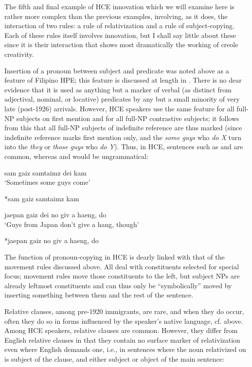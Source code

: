 The fifth and final example of HCE innovation which we will examine here is rather more complex than the previous examples, involving, as it does, the interaction of two rules: a rule of relativization and a rule of subject-copying. Each of these rules itself involves inno\-vation, but I shall say little about these since it is their interaction that shows most dramatically the working of creole creativity.

Insertion of a pronoun between subject and predicate was noted above as a feature of Filipino HPE; this feature is discussed at length in \citet[3.6.1]{BickertonEtAl1976}. There is no dear evidence that it is used as anything but a marker of verbal (as distinct from adjectival, nominal, or locative) predicates by any but a small minority of very late (post-1926) arrivals. However, HCE speakers use the same feature for all full-NP subjects on first mention and for all full-NP contrastive subjects; it follows from this that all full-NP subjects of indefinite refer\-ence are thus marked (since indefinite reference marks first mention only, and the \textit{some guys} who \textit{do X} turn into the \textit{they} or \textit{those guys} who \textit{do Y}). Thus, in HCE, sentences such as  and  are common, whereas  and  would be ungrammatical:

\ea\label{ex:69}
 sam gaiz samtaimz dei kam \\
\glt `Sometimes some guys come'
\z

\ea\label{ex:70}
 *sam gaiz samtaimz kam
\z

\ea\label{ex:71}
 jaepan gaiz dei no giv a haeng, do\\
\glt  `Guys from Japan don't give a hang, though'
\z

\ea\label{ex:72}
 *jaepan gaiz no giv a haeng, do
\z

\noindent The function of pronoun-copying in HCE is dearly linked with that of the movement rules discussed above. All deal with constituents selected for special focus; movement rules move those constituents to the left, but subject NPs are already leftmost constituents and can thus only be ``symbolically'' moved by inserting something between them and the rest of the sentence.

Relative clauses, among pre-1920 immigrants, are rare, and when they do occur, often they do so in forms influenced by the speaker's native language, cf.  above. Among HCE speakers, relative clauses are common. However, they differ from English relative clauses in that they contain no surface marker of relativization even where English demands one, i.e., in sentences where the noun relativized on is sub\-ject of the clause, and either subject  or object  of the main sentence:

